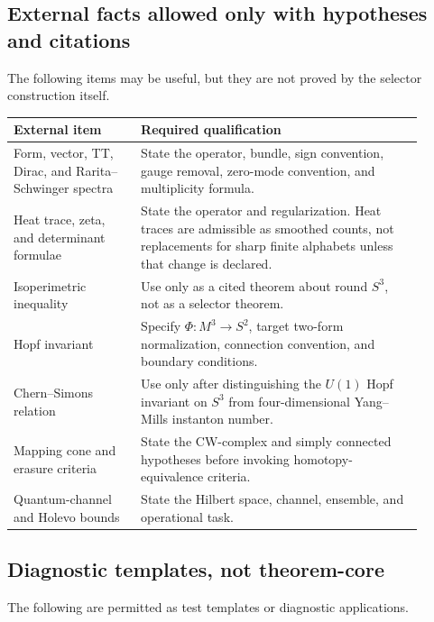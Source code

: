 \documentclass[11pt,a4paper]{article}
\begin{document}
\subsection{External facts allowed only with hypotheses and citations}

The following items may be useful, but they are not proved by the selector construction itself.

\begin{center}
\small
\begin{tabular}{p{0.28\linewidth}p{0.62\linewidth}}
\toprule
External item & Required qualification\\
\midrule
Form, vector, TT, Dirac, and Rarita--Schwinger spectra & State the operator, bundle, sign convention, gauge removal, zero-mode convention, and multiplicity formula.\\
Heat trace, zeta, and determinant formulae & State the operator and regularization.  Heat traces are admissible as smoothed counts, not replacements for sharp finite alphabets unless that change is declared.\\
Isoperimetric inequality & Use only as a cited theorem about round \(S^3\), not as a selector theorem.\\
Hopf invariant & Specify \(\Phi:M^3\to S^2\), target two-form normalization, connection convention, and boundary conditions.\\
Chern--Simons relation & Use only after distinguishing the \(U(1)\) Hopf invariant on \(S^3\) from four-dimensional Yang--Mills instanton number.\\
Mapping cone and erasure criteria & State the CW-complex and simply connected hypotheses before invoking homotopy-equivalence criteria.\\
Quantum-channel and Holevo bounds & State the Hilbert space, channel, ensemble, and operational task.\\
\bottomrule
\end{tabular}
\end{center}

\subsection{Diagnostic templates, not theorem-core}

The following are permitted as test templates or diagnostic applications.
\end{document}
